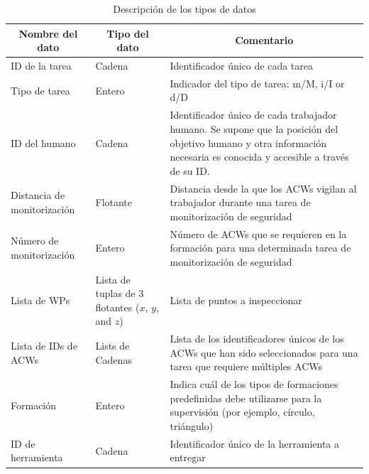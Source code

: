 \documentclass[fontsize=11pt, English=false, Español=true, Myfinal=true, twoside, numbers=noenddot]{scrbook}
\begin{document}
\begin{table}[htb]
    \centering
    \caption{Descripción de los tipos de datos}
    \label{tab:shareddata}
    \small
    \begin{tabular}{|p{}|p{}|p{}|}
      \hline
      \multicolumn{1}{|c}{\textbf{Nombre del dato}} & \multicolumn{1}{|c|}{\textbf{Tipo del dato}} & \multicolumn{1}{c|}{\textbf{Comentario}} \\ \hline \hline
      
      ID de la tarea & Cadena & Identificador único de cada tarea \\ \hline
      
      Tipo de tarea & Entero & Indicador del tipo de tarea: m/M, i/I or d/D \\ \hline
      
      ID del humano & Cadena & Identificador único de cada trabajador humano. Se supone que la posición del objetivo humano y otra información necesaria es conocida y accesible a través de su ID. \\ \hline
      
      Distancia de monitorización & Flotante & Distancia desde la que los \glspl{ACW} vigilan al trabajador durante una tarea de monitorización de seguridad  \\ \hline
      
      Número de monitorización & Entero & Número de \glspl{ACW} que se requieren en la formación para una determinada tarea de monitorización de seguridad \\ \hline
      
      Lista de WPs & Lista de tuplas de $3$ flotantes ($x$, $y$, and $z$) & Lista de puntos a inspeccionar \\ \hline
      
      Lista de IDs de \glspl{ACW} & Lists de Cadenas & Lista de los identificadores únicos de los \glspl{ACW} que han sido seleccionados para una tarea que requiere múltiples \glspl{ACW} \\ \hline
      
      Formación & Entero & Indica cuál de los tipos de formaciones predefinidas debe utilizarse para la supervisión (por ejemplo, círculo, triángulo) \\ \hline
      
      ID de herramienta & Cadena & Identificador único de la herramienta a entregar \\ \hline
      

\end{tabular}
\end{table}
\end{document}

